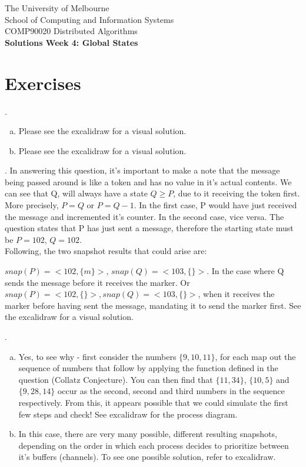\documentclass[12pt]{article}
\newcounter{question}
\newcommand{\question}[1]{
    \stepcounter{question}
    \thequestion. #1 \hfill
}
\begin{document}
\begin{center}
    {\sc The University of Melbourne
        \\
        School of Computing and Information Systems
        \\
    COMP90020 Distributed Algorithms}
    \bigskip \\
    {\Large\bf Solutions Week 4: Global States}
\end{center}

\section*{Exercises}

\setcounter{question}{14}

\question{

    \begin{enumerate}[(a)]
        \item Please see the excalidraw for a visual solution.
        \item Please see the excalidraw for a visual solution.
    \end{enumerate}
}


\question{In answering this question, it's important to make a note that the message being passed around is like a token
    and has no value in it's actual contents. We can see that Q, will always have a state $Q \geq P$, due to it receiving the token
    first. More precisely, $P = Q$ or $P = Q - 1$. In the first case, P would have just received the message and incremented it's counter. In the second case, vice versa. The question states that P has just sent a message, therefore the starting state must be $P=102$, $Q = 102$.\\

    Following, the two snapshot results that could arise are:

    $snap(P) =  <102, \{m\}>$, $snap(Q) = <103, \{\}>$. In the case where Q sends the message before it receives the marker. Or $snap(P) =  <102, \{\}>, snap(Q) = <103, \{\}>$, when it receives the marker before having sent the message, mandating it to send the marker first. See the excalidraw for a visual solution.
}


\question{}


\begin{enumerate}[(a)]
    \item Yes, to see why - first consider the numbers $\{9,10,11\}$, for each map out the sequence of numbers that follow by applying the function defined in the question (Collatz Conjecture). You can then find that $\{11,34\}$, $\{10,5\}$ and $\{9,28,14\}$ occur as the second, second and third numbers in the sequence respectively. From this, it appears possible that we could simulate the first few steps and check! See excalidraw for the process diagram.
    \item In this case, there are very many possible, different resulting snapshots, depending on the order in which each process decides to prioritize between it's buffers (channels). To see one possible solution, refer to excalidraw.
\end{enumerate}
\end{document}
